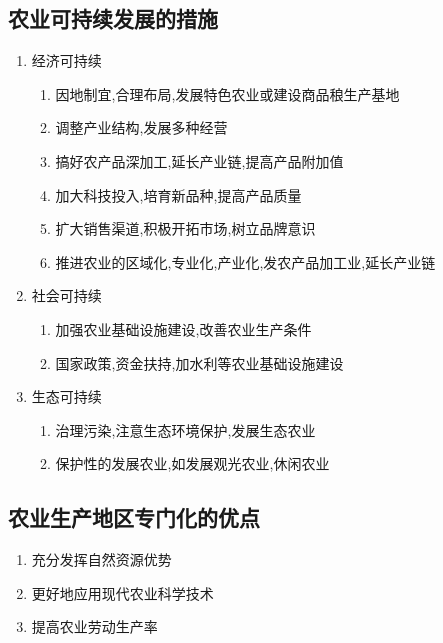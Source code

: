 \documentclass[a4paper]{article}
\begin{document}
    \subsection{农业可持续发展的措施}
    \begin{enumerate}
        \item 经济可持续
        \begin{enumerate}
            \item 因地制宜,合理布局,发展特色农业或建设商品稂生产基地
            \item 调整产业结构,发展多种经营
            \item 搞好农产品深加工,延长产业链,提高产品附加值
            \item 加大科技投入,培育新品种,提高产品质量
            \item 扩大销售渠道,积极开拓市场,树立品牌意识
            \item 推进农业的区域化,专业化,产业化,发农产品加工业,延长产业链
        \end{enumerate}
        \item 社会可持续
        \begin{enumerate}
            \item 加强农业基础设施建设,改善农业生产条件
            \item 国家政策,资金扶持,加水利等农业基础设施建设
        \end{enumerate}
        \item 生态可持续
        \begin{enumerate}
            \item 治理污染,注意生态环境保护,发展生态农业
            \item 保护性的发展农业,如发展观光农业,休闲农业
        \end{enumerate}
    \end{enumerate}
    \subsection{农业生产地区专门化的优点}
    \begin{enumerate}
        \item 充分发挥自然资源优势
        \item 更好地应用现代农业科学技术
        \item 提高农业劳动生产率
    \end{enumerate}
\end{document}
